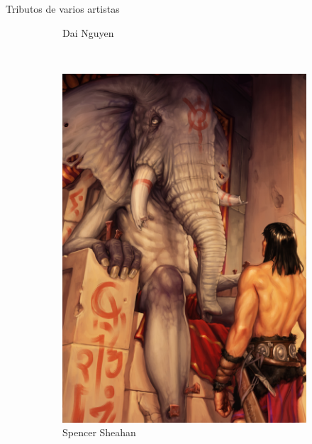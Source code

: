 \begin{frame}{Tributos de varios artistas}
\begin{figure}[htp]
\begin{subfigure}[b]{0.22\textwidth}
			\caption{Dai Nguyen}
		\end{subfigure}
		~
		\begin{subfigure}[b]{0.22\textwidth}
			\includegraphics[width=\textwidth]{img/tributos/elephant08}
			\caption{Spencer Sheahan}
		\end{subfigure}
		~
		\begin{subfigure}[b]{0.22\textwidth}

\end{subfigure}
\end{figure}
\end{frame}

